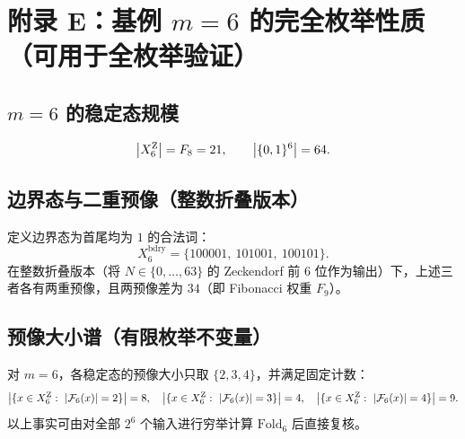 \section{附录 E：基例 \texorpdfstring{$m=6$}{m=6} 的完全枚举性质（可用于全枚举验证）}
\label{app:m6-enum}

\subsection{\texorpdfstring{$m=6$}{m=6} 的稳定态规模}

\[
\left\lvert X_6^{\mathrm Z}\right\rvert=F_8=21,\qquad \left\lvert \{0,1\}^6\right\rvert=64.
\]

\subsection{边界态与二重预像（整数折叠版本）}

定义边界态为首尾均为 $1$ 的合法词：
\[
X^{\mathrm{bdry}}_6=\{100001,\ 101001,\ 100101\}.
\]
在整数折叠版本（将 $N\in\{0,\dots,63\}$ 的 Zeckendorf 前 $6$ 位作为输出）下，上述三者各有两重预像，且两预像差为 $34$（即 Fibonacci 权重 $F_9$）。

\subsection{预像大小谱（有限枚举不变量）}

对 $m=6$，各稳定态的预像大小只取 $\{2,3,4\}$，并满足固定计数：
\[
\card{\{x\in X_6^{\mathrm Z}:\ \card{\mathcal{F}_6(x)}=2\}}=8,\quad
\card{\{x\in X_6^{\mathrm Z}:\ \card{\mathcal{F}_6(x)}=3\}}=4,\quad
\card{\{x\in X_6^{\mathrm Z}:\ \card{\mathcal{F}_6(x)}=4\}}=9.
\]
以上事实可由对全部 $2^6$ 个输入进行穷举计算 $\mathrm{Fold}_6$ 后直接复核。

